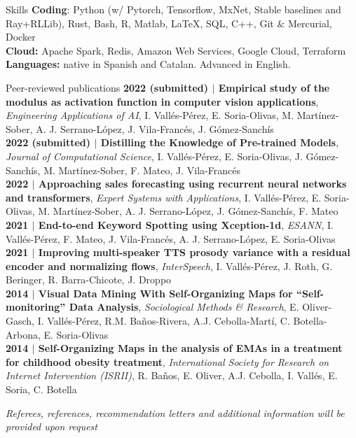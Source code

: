 \documentclass{resume} %
\begin{document}


\begin{rSection}{Skills} \itemsep -3pt
{\textbf{Coding}: Python (w/ Pytorch, Tensorflow, MxNet, Stable baselines and Ray+RLLib), Rust, Bash, R, Matlab, \LaTeX, SQL, C++, Git \& Mercurial, Docker}  \\
{\textbf{Cloud:} Apache Spark, Redis, Amazon Web Services, Google Cloud, Terraform} \\
{\textbf{Languages:} native in Spanish and Catalan. Advanced in English.}
\end{rSection}


\newpage
\begin{rSection}{Peer-reviewed publications}
{\textbf{{2022} (submitted) $|$ Empirical study of the modulus as activation function in computer vision applications}, \textit{Engineering Applications of AI}, I. Vallés-Pérez, E. Soria-Olivas, M. Martínez-Sober, A. J. Serrano-López, J. Vila-Francés, J. Gómez-Sanchís}\\
{\textbf{{2022} (submitted) $|$ Distilling the Knowledge of Pre-trained Models}, \textit{Journal of Computational Science}, I. Vallés-Pérez, E. Soria-Olivas, J. Gómez-Sanchís, M. Martínez-Sober, F. Mateo, J. Vila-Francés }\\
{\textbf{{2022} $|$ Approaching sales forecasting using recurrent neural networks and transformers}, \textit{Expert Systems with Applications}, I. Vallés-Pérez, E. Soria-Olivas, M. Martínez-Sober, A. J. Serrano-López, J. Gómez-Sanchís, F. Mateo}\\
{\textbf{{2021} $|$ End-to-end Keyword Spotting using Xception-1d}, \textit{ESANN}, I. Vallés-Pérez, F. Mateo, J. Vila-Francés, A. J. Serrano-López, E. Soria-Olivas}\\
{\textbf{{2021} $|$ Improving multi-speaker TTS prosody variance with a residual encoder and normalizing flows}, \textit{InterSpeech}, I. Vallés-Pérez, J. Roth, G. Beringer, R. Barra-Chicote, J. Droppo}\\
{\textbf{{2014} $|$ Visual Data Mining With Self-Organizing Maps for ``Self-monitoring'' Data Analysis}, \textit{Sociological Methods \& Research}, E. Oliver-Gasch, I. Vallés-Pérez, R.M. Baños-Rivera, A.J. Cebolla-Martí, C. Botella-Arbona, E. Soria-Olivas}\\
{\textbf{{2014} $|$ Self-Organizing Maps in the analysis of EMAs in a treatment for childhood obesity treatment}, \textit{International Society for Research on Internet Intervention (ISRII)}, R. Baños, E. Oliver, A.J. Cebolla, I. Vallés, E. Soria, C. Botella}

\end{rSection}

\vspace{\fill}
\begin{flushright}
	\small{\textit{Referees, references, recommendation letters and additional information will be provided upon request}}
\end{flushright}
\end{document}
